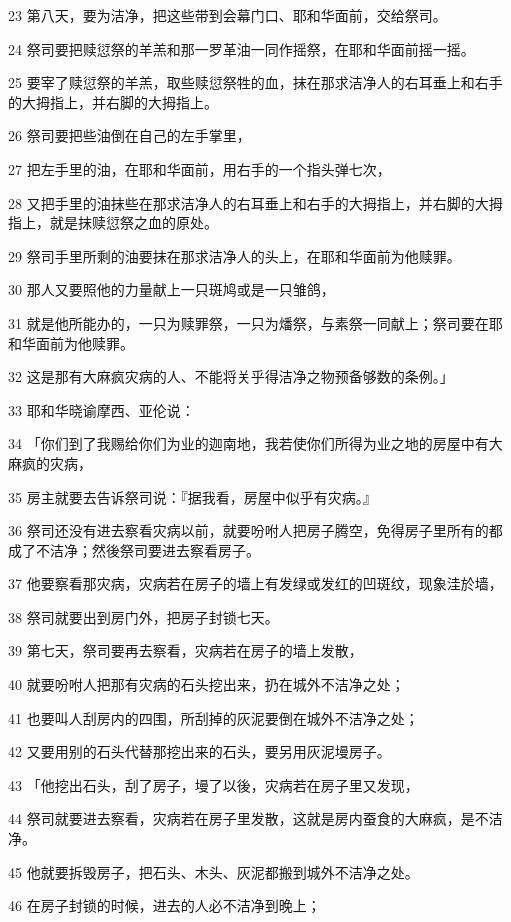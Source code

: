 \par 23 第八天，要为洁净，把这些带到会幕门口、耶和华面前，交给祭司。
\par 24 祭司要把赎愆祭的羊羔和那一罗革油一同作摇祭，在耶和华面前摇一摇。
\par 25 要宰了赎愆祭的羊羔，取些赎愆祭牲的血，抹在那求洁净人的右耳垂上和右手的大拇指上，并右脚的大拇指上。
\par 26 祭司要把些油倒在自己的左手掌里，
\par 27 把左手里的油，在耶和华面前，用右手的一个指头弹七次，
\par 28 又把手里的油抹些在那求洁净人的右耳垂上和右手的大拇指上，并右脚的大拇指上，就是抹赎愆祭之血的原处。
\par 29 祭司手里所剩的油要抹在那求洁净人的头上，在耶和华面前为他赎罪。
\par 30 那人又要照他的力量献上一只斑鸠或是一只雏鸽，
\par 31 就是他所能办的，一只为赎罪祭，一只为燔祭，与素祭一同献上；祭司要在耶和华面前为他赎罪。
\par 32 这是那有大麻疯灾病的人、不能将关乎得洁净之物预备够数的条例。」
\par 33 耶和华晓谕摩西、亚伦说：
\par 34 「你们到了我赐给你们为业的迦南地，我若使你们所得为业之地的房屋中有大麻疯的灾病，
\par 35 房主就要去告诉祭司说：『据我看，房屋中似乎有灾病。』
\par 36 祭司还没有进去察看灾病以前，就要吩咐人把房子腾空，免得房子里所有的都成了不洁净；然後祭司要进去察看房子。
\par 37 他要察看那灾病，灾病若在房子的墙上有发绿或发红的凹斑纹，现象洼於墙，
\par 38 祭司就要出到房门外，把房子封锁七天。
\par 39 第七天，祭司要再去察看，灾病若在房子的墙上发散，
\par 40 就要吩咐人把那有灾病的石头挖出来，扔在城外不洁净之处；
\par 41 也要叫人刮房内的四围，所刮掉的灰泥要倒在城外不洁净之处；
\par 42 又要用别的石头代替那挖出来的石头，要另用灰泥墁房子。
\par 43 「他挖出石头，刮了房子，墁了以後，灾病若在房子里又发现，
\par 44 祭司就要进去察看，灾病若在房子里发散，这就是房内蚕食的大麻疯，是不洁净。
\par 45 他就要拆毁房子，把石头、木头、灰泥都搬到城外不洁净之处。
\par 46 在房子封锁的时候，进去的人必不洁净到晚上；
